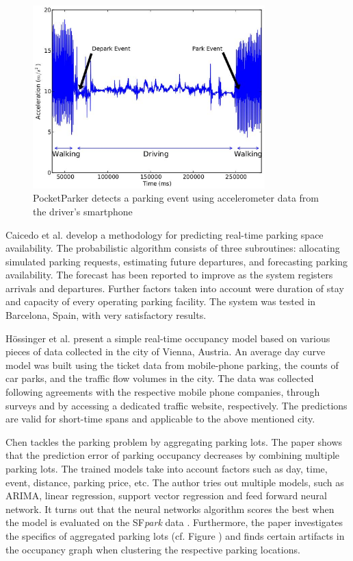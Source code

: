 \begin{figure}[!ht]
	\centering
	\includegraphics[width=0.8\textwidth]{graphics/related_work/nandugudi_1.png}
	\caption{PocketParker detects a parking event using accelerometer data from the driver's smartphone } %
	\label{fig:related_work_nandugudi}
\end{figure}

Caicedo et al. \cite{caicedo} develop a methodology for predicting real-time parking space availability. The probabilistic algorithm consists of three subroutines: allocating simulated parking requests, estimating future departures, and forecasting parking availability. The forecast has been reported to improve as the system registers arrivals and departures. Further factors taken into account were duration of stay and capacity of every operating parking facility. The system was tested in Barcelona, Spain, with very satisfactory results.

H\"ossinger et al. \cite{hoessinger} present a simple real-time occupancy model based on various pieces of data collected in the city of Vienna, Austria. An average day curve model was built using the ticket data from mobile-phone parking, the counts of car parks, and the traffic flow volumes in the city.  The data was collected following agreements with the respective mobile phone companies, through surveys and by accessing a dedicated traffic website, respectively. The predictions are valid for short-time spans and applicable to the above mentioned city.

Chen \cite{xchen} tackles the parking problem by aggregating parking lots. The paper shows that the prediction  error of parking occupancy decreases by combining multiple parking lots. The trained models take into account factors such as day, time, event, distance, parking price, etc. The author tries out multiple models, such as ARIMA, linear regression, support vector regression and feed forward neural network. It turns out that the neural networks algorithm scores the best when the model is evaluated on the SF\textit{park} data \cite{sfpark_open_data}. Furthermore, the paper investigates the specifics of aggregated parking lots (cf. Figure ) and finds certain artifacts in the occupancy graph when clustering the respective parking locations.

